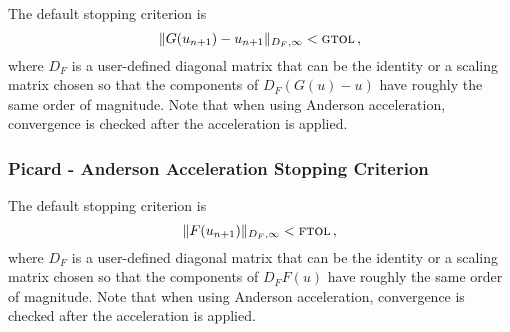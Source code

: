The default stopping criterion is
\[ \|G(u_{n+1}) - u_{n+1} \|_{D_F,\infty} < \mbox{\sc gtol} \, , \]
where $D_F$ is a user-defined diagonal matrix that can be the identity
or a scaling matrix chosen so that the components of $D_F (G(u)-u)$ have
roughly the same order of magnitude.
Note that when using Anderson acceleration,
convergence is checked after the acceleration is applied.


\subsubsection*{Picard - Anderson Acceleration Stopping Criterion}

The default stopping criterion is
\[ \|F(u_{n+1})\|_{D_F,\infty} < \mbox{\sc ftol} \, , \]
where $D_F$ is a user-defined diagonal matrix that can be the identity
or a scaling matrix chosen so that the components of $D_F F(u)$ have
roughly the same order of magnitude.
Note that when using Anderson acceleration,
convergence is checked after the acceleration is applied.
